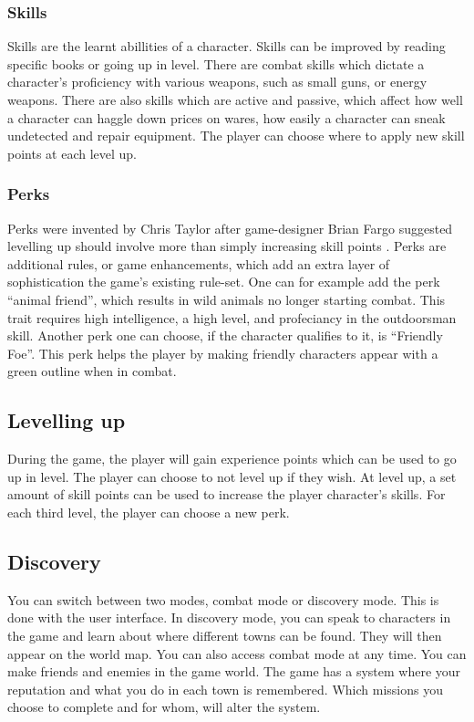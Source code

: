 \subsubsection{Skills}

Skills are the learnt abillities of a character. Skills can be improved by reading specific books or going up in level. There are combat skills which dictate a character's proficiency with various weapons, such as small guns, or energy weapons. There are also skills which are active and passive, which affect how well a character can haggle down prices on wares, how easily a character can sneak undetected and repair equipment. The player can choose where to apply new skill points at each level up.

\subsubsection{Perks}

Perks were invented by Chris Taylor after game-designer Brian Fargo suggested levelling up should involve more than simply increasing skill points \autocite{fargo}. Perks are additional rules, or game enhancements, which add an extra layer of sophistication the game's existing rule-set. One can for example add the perk ``animal friend'', which results in wild animals no longer starting combat. This trait requires high intelligence, a high level, and profeciancy in the outdoorsman skill. Another perk one can choose, if the character qualifies to it, is ``Friendly Foe''. This perk helps the player by making friendly characters appear with a green outline when in combat.

\subsection{Levelling up}

During the game, the player will gain experience points which can be used to go up in level. The player can choose to not level up if they wish. At level up, a set amount of skill points can be used to increase the player character's skills. For each third level, the player can choose a new perk.

\subsection{Discovery}

You can switch between two modes, combat mode or discovery mode. This is done with the user interface. In discovery mode, you can speak to characters in the game and learn about where different towns can be found. They will then appear on the world map. You can also access combat mode at any time. You can make friends and enemies in the game world. The game has a system where your reputation and what you do in each town is remembered. Which missions you choose to complete and for whom, will alter the system.

